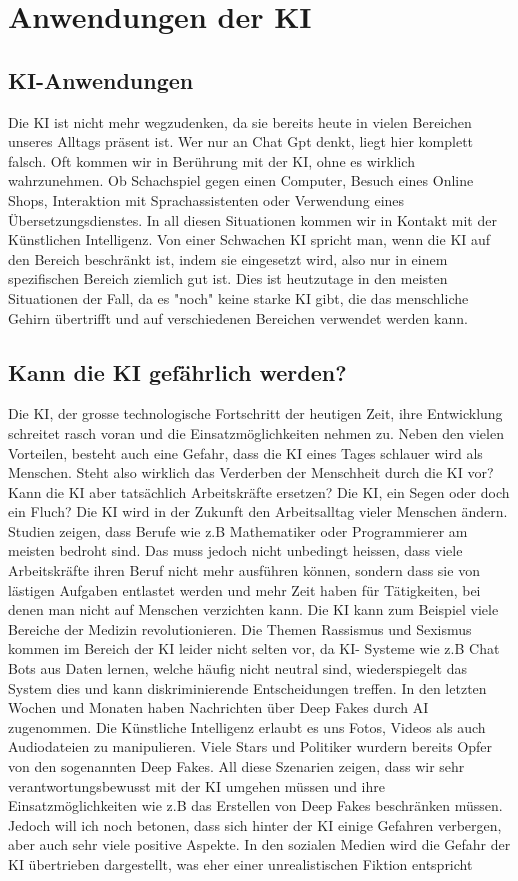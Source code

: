 \chapter{Anwendungen der KI}
\label{chap:Anwendungen}

\section{KI-Anwendungen}
Die KI ist nicht mehr wegzudenken, da sie bereits heute in vielen Bereichen unseres Alltags präsent ist. Wer nur an Chat Gpt denkt, liegt hier komplett falsch. Oft kommen wir in Berührung mit der KI, ohne es wirklich wahrzunehmen. Ob Schachspiel gegen einen Computer, Besuch eines Online Shops, Interaktion mit Sprachassistenten oder Verwendung eines Übersetzungsdienstes. In all diesen Situationen kommen wir in Kontakt mit der Künstlichen Intelligenz. Von einer Schwachen KI spricht man, wenn die KI auf den Bereich beschränkt ist, indem sie eingesetzt wird, also nur in einem spezifischen Bereich ziemlich gut ist. Dies ist heutzutage in den meisten Situationen der Fall, da es "noch" keine starke KI gibt, die das menschliche Gehirn übertrifft und auf verschiedenen Bereichen verwendet werden kann. 



\section{Kann die KI gefährlich werden?}
Die KI, der grosse technologische Fortschritt der heutigen Zeit, ihre  Entwicklung  schreitet rasch voran und die Einsatzmöglichkeiten nehmen zu. Neben den vielen Vorteilen, besteht auch eine Gefahr, dass die KI eines Tages schlauer wird als Menschen. Steht also wirklich das Verderben der Menschheit durch die KI vor? Kann die KI aber tatsächlich Arbeitskräfte ersetzen? Die KI, ein Segen oder doch ein Fluch? Die KI wird in der Zukunft den Arbeitsalltag vieler Menschen ändern. Studien zeigen, dass Berufe wie z.B Mathematiker oder Programmierer am meisten bedroht sind. Das muss jedoch nicht unbedingt heissen, dass viele Arbeitskräfte ihren Beruf nicht mehr ausführen können, sondern dass sie von lästigen Aufgaben entlastet werden und mehr Zeit haben für Tätigkeiten, bei denen man nicht auf Menschen verzichten kann. Die KI kann zum Beispiel viele Bereiche der Medizin revolutionieren. Die Themen Rassismus und Sexismus kommen im Bereich der KI leider nicht selten vor, da KI- Systeme wie z.B Chat Bots aus Daten lernen, welche häufig nicht neutral sind, wiederspiegelt das System dies und kann diskriminierende Entscheidungen treffen. In den letzten Wochen und Monaten haben Nachrichten über Deep Fakes durch AI zugenommen. Die Künstliche Intelligenz erlaubt es uns Fotos, Videos als auch Audiodateien zu manipulieren. Viele Stars und Politiker wurdern bereits Opfer von den sogenannten Deep Fakes. All diese Szenarien zeigen, dass wir sehr verantwortungsbewusst mit der KI umgehen müssen und ihre Einsatzmöglichkeiten wie z.B das Erstellen von Deep Fakes beschränken müssen. Jedoch will ich noch betonen, dass sich hinter der KI einige Gefahren verbergen, aber auch sehr viele positive Aspekte. In den sozialen Medien wird die Gefahr der KI übertrieben dargestellt, was eher einer unrealistischen Fiktion entspricht

